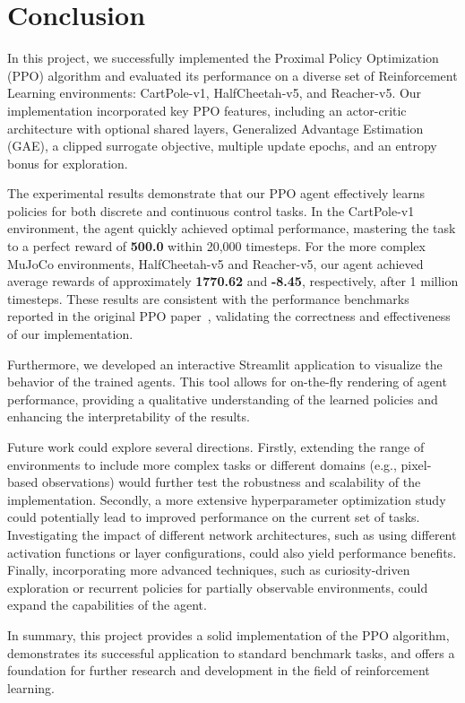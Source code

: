\section{Conclusion}\label{sec:conclusion}
In this project, we successfully implemented the Proximal Policy Optimization (PPO) algorithm and evaluated its performance on a diverse set of Reinforcement Learning environments: CartPole-v1, HalfCheetah-v5, and Reacher-v5. Our implementation incorporated key PPO features, including an actor-critic architecture with optional shared layers, Generalized Advantage Estimation (GAE), a clipped surrogate objective, multiple update epochs, and an entropy bonus for exploration.

The experimental results demonstrate that our PPO agent effectively learns policies for both discrete and continuous control tasks. In the CartPole-v1 environment, the agent quickly achieved optimal performance, mastering the task to a perfect reward of \textbf{500.0} within 20,000 timesteps. For the more complex MuJoCo environments, HalfCheetah-v5 and Reacher-v5, our agent achieved average rewards of approximately \textbf{1770.62} and \textbf{-8.45}, respectively, after 1 million timesteps. These results are consistent with the performance benchmarks reported in the original PPO paper~\cite{schulman2017proximal}, validating the correctness and effectiveness of our implementation.

Furthermore, we developed an interactive Streamlit application to visualize the behavior of the trained agents. This tool allows for on-the-fly rendering of agent performance, providing a qualitative understanding of the learned policies and enhancing the interpretability of the results.

Future work could explore several directions. Firstly, extending the range of environments to include more complex tasks or different domains (e.g., pixel-based observations) would further test the robustness and scalability of the implementation. Secondly, a more extensive hyperparameter optimization study could potentially lead to improved performance on the current set of tasks. Investigating the impact of different network architectures, such as using different activation functions or layer configurations, could also yield performance benefits. Finally, incorporating more advanced techniques, such as curiosity-driven exploration or recurrent policies for partially observable environments, could expand the capabilities of the agent.

In summary, this project provides a solid implementation of the PPO algorithm, demonstrates its successful application to standard benchmark tasks, and offers a foundation for further research and development in the field of reinforcement learning.